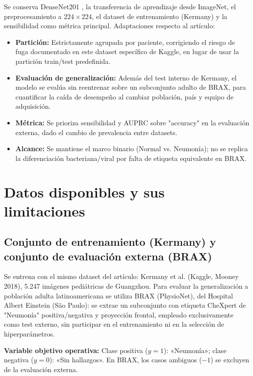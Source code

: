 \documentclass[11pt]{article}
\begin{document}
Se conserva DenseNet201 \parencite{huang2017}, la transferencia de aprendizaje desde ImageNet, el preprocesamiento a $224 \times 224$, el dataset de entrenamiento (Kermany) y la sensibilidad como métrica principal. Adaptaciones respecto al artículo:
\begin{itemize}
  \item \textbf{Partición:} Estrictamente agrupada por paciente, corrigiendo el riesgo de fuga documentado en este dataset específico de Kaggle, en lugar de usar la partición train/test predefinida.
  \item \textbf{Evaluación de generalización:} Además del test interno de Kermany, el modelo se evalúa sin reentrenar sobre un subconjunto adulto de BRAX, para cuantificar la caída de desempeño al cambiar población, país y equipo de adquisición.
  \item \textbf{Métrica:} Se prioriza sensibilidad y AUPRC sobre "accuracy" en la evaluación externa, dado el cambio de prevalencia entre datasets.
  \item \textbf{Alcance:} Se mantiene el marco binario (Normal vs. Neumonía); no se replica la diferenciación bacteriana/viral por falta de etiqueta equivalente en BRAX.
\end{itemize}

\section{Datos disponibles y sus limitaciones}

\subsection{Conjunto de entrenamiento (Kermany) y conjunto de evaluación externa (BRAX)}

Se entrena con el mismo dataset del artículo: Kermany et al. \parencite{kermany2018} (Kaggle, Mooney 2018), 5.247 imágenes pediátricas de Guangzhou. Para evaluar la generalización a población adulta latinoamericana se utiliza BRAX \parencite{reis2022a, reis2022b} (PhysioNet), del Hospital Albert Einstein (São Paulo): se extrae un subconjunto con etiqueta CheXpert \parencite{irvin2019} de "Neumonía" positiva/negativa y proyección frontal, empleado exclusivamente como test externo, sin participar en el entrenamiento ni en la selección de hiperparámetros.

\textbf{Variable objetivo operativa:} Clase positiva ($y=1$): «Neumonía»; clase negativa ($y=0$): «Sin hallazgos». En BRAX, los casos ambiguos ($-1$) se excluyen de la evaluación externa.
\end{document}
